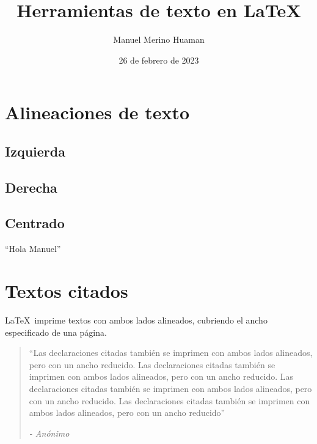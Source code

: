 \documentclass[a4paper, 11pt]{article}
\author{Manuel Merino Huaman}
\title{Herramientas de texto en \LaTeX}
\date{26 de febrero de 2023}
\begin{document}
\maketitle %

\section{Alineaciones de texto}
    
    \subsection{Izquierda}
        \begin{flushleft}
            \lipsum[9]
        \end{flushleft}
    
    \subsection{Derecha}
        \begin{flushright}
            \lipsum[8]
        \end{flushright}
        
    \subsection{Centrado}
        \begin{center}
            \lipsum[9]
        \end{center}
        
        
        
    ``Hola Manuel''
    
    \newpage
    
    \section{Textos citados}
    \LaTeX\, imprime textos con ambos lados alineados, cubriendo el ancho especificado de una página.
    \begin{quotation}
        \begin{spacing}{1.2}
            ``Las declaraciones citadas también se imprimen con ambos lados alineados, pero con un ancho reducido. Las declaraciones citadas también se imprimen con ambos lados alineados, pero con un ancho reducido. Las declaraciones citadas también se imprimen con ambos lados alineados, pero con un ancho reducido. Las declaraciones citadas también se imprimen con ambos lados alineados, pero con un ancho reducido''
        \end{spacing}      
        \begin{flushright}
            {\it - Anónimo}
        \end{flushright}
    \end{quotation}
    
\end{document}
